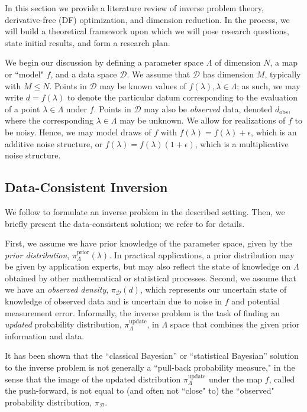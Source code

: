 \documentclass{amsart}
\begin{document}
In this section we provide a literature review of inverse problem theory, derivative-free (DF) optimization, and dimension reduction. 
In the process, we will build a theoretical framework upon which we will pose research questions, state initial results, and form a research plan. 

We begin our discussion by defining a parameter space $\Lambda$ of dimension $N$, a map or ``model" $f$, and a data space $\mathcal{D}$. We assume that $\mathcal{D}$ has dimension $M$, typically with $M\leq N$. Points in $\mathcal{D}$ may be known values of $f(\lambda), \lambda\in \Lambda$; as such, we may write $d=f(\lambda)$ to denote the particular datum corresponding to the evaluation of a point $\lambda \in \Lambda$ under $f$. Points in $\mathcal{D}$ may also be \textit{observed} data, denoted $d_{\text{obs}}$, where the corresponding $\lambda\in \Lambda$ may be unknown. We allow for realizations of $f$ to be  noisy. Hence, we may model draws of $f$ with $f(\lambda)=f(\lambda)+\epsilon$, which is an additive noise structure, or $f(\lambda)=f(\lambda)(1+\epsilon)$, which is a multiplicative noise structure.


\subsection{Data-Consistent Inversion}


We follow \cite{BJW18a, Stuart, Tarantola} to formulate an inverse problem in the described setting. Then, we briefly present the data-consistent solution; we refer to \cite{BJW18a} for details.

First, we assume we have prior knowledge of the parameter space, given by the \emph{prior distribution}, $\pi_\Lambda^\text{prior}(\lambda)$. In practical applications, a prior distribution may be given by application experts, but may also reflect the state of knowledge on $\Lambda$ obtained by other mathematical or statistical processes. Second, we assume that we have an \emph{observed density}, $\pi_\mathcal{D}(d)$, which represents our uncertain state of knowledge of observed data and is uncertain due to noise in $f$ and potential measurement error. Informally, the inverse problem is the task of finding an \emph{updated} probability distribution, $\pi_\Lambda^\text{update}$, in $\Lambda$ space that combines the given prior information and data.

It has been shown \cite{BJW18a} that the ``classical Bayesian'' or ``statistical Bayesian'' solution to the inverse problem is not generally a 
``pull-back probability measure," in the sense that the image of the updated distribution $\pi_\Lambda^\text{update}$ under the map $f$, called the push-forward, is not equal to (and often not ``close" to) the ``observed" probability distribution, $\pi_\mathcal{D}$. 
\end{document}
